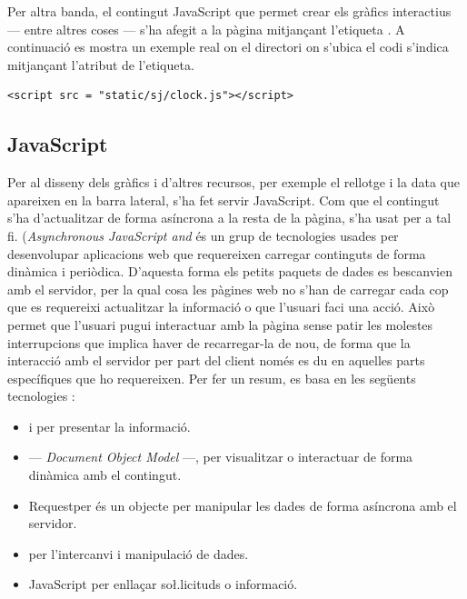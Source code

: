 \documentclass{tfgitic}[2022/06/30]
\begin{document}
Per altra banda, el contingut JavaScript que permet crear els gràfics interactius --- entre altres coses --- s'ha afegit a la pàgina mitjançant l'etiqueta . A continuació es mostra un exemple real on el directori on s'ubica el codi s'indica mitjançant l'atribut  de l'etiqueta.

\begin{lstlisting}[style = html]
<script src = "static/sj/clock.js"></script>
\end{lstlisting}

\subsection{JavaScript}
\label{section: javascript}
Per al disseny dels gràfics i d'altres recursos, per exemple el rellotge i la data que apareixen en la barra lateral, s'ha fet servir JavaScript. Com que el contingut s'ha d'actualitzar de forma asíncrona a la resta de la pàgina, s'ha usat  per a tal fi.  (\emph{Asynchronous JavaScript and } és un grup de tecnologies usades per desenvolupar aplicacions web que requereixen carregar continguts de forma dinàmica i periòdica. D'aquesta forma els petits paquets de dades es bescanvien amb el servidor, per la qual cosa les pàgines web no s'han de carregar cada cop que es requereixi actualitzar la informació o que l'usuari faci una acció. Això permet que l'usuari pugui interactuar amb la pàgina sense patir les molestes interrupcions que implica haver de recarregar-la de nou, de forma que la interacció amb el servidor per part del client només es du en aquelles parts específiques que ho requereixen. Per fer un resum,  es basa en les següents tecnologies \cite{ajax:ibm}:

\begin{itemize}
    \item {} i  per presentar la informació.
    \item {} --- \emph{Document Object Model} ---, per visualitzar o interactuar de forma dinàmica amb el contingut.
    \item {}Requestper és un objecte per manipular les dades de forma asíncrona amb el servidor.
    \item {} per l'intercanvi i manipulació de dades.
    \item JavaScript per enllaçar so\l.licituds o informació.
\end{itemize}
\end{document}

